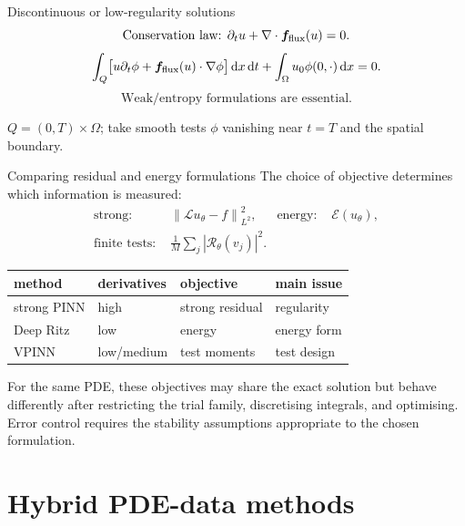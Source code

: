 \documentclass[aspectratio=43,11pt]{beamer}
\newcommand{\slideid}{L3}
\newcommand{\dd}{\,\mathrm d}
\newcommand{\Lop}{\mathcal{L}}
\newcommand{\Energy}{\mathcal{E}}
\newcommand{\WeakRes}{\mathcal{R}}
\newcommand{\norm}[1]{\left\lVert #1\right\rVert}
\newcommand{\labnote}[1]{{\scriptsize\color{courseBlue}#1\par}}
\begin{document}
\renewcommand{\slideid}{L3-S095}
\begin{frame}[c]{Discontinuous or low-regularity solutions}
\small
\[
\text{Conservation law: }
\partial_tu+\nabla\cdot \bm f_{\rm flux}(u)=0.
\]
\[
\int_Q\bigl[u\partial_t\phi+\bm f_{\rm flux}(u)\cdot\nabla\phi\bigr]\dd x\dd t
+\int_\Omega u_0\phi(0,\cdot)\dd x=0.
\]
\[
\text{Weak/entropy formulations are essential.}
\]
\labnote{$Q=(0,T)\times\Omega$; take smooth tests $\phi$ vanishing near $t=T$ and the spatial boundary.}
\end{frame}

\renewcommand{\slideid}{L3-S096}
\begin{frame}[c]{Comparing residual and energy formulations}
\small
The choice of objective determines which information is measured:
\[
\begin{aligned}
\text{strong: }&\norm{\Lop u_\theta-f}_{L^2}^2,
&\text{energy: }&\Energy(u_\theta),\\
\text{finite tests: }&\frac1M\sum_j|\WeakRes_\theta(v_j)|^2.
\end{aligned}
\]
\begin{center}
\begin{tabular}{llll}
\toprule
method & derivatives & objective & main issue \\
\midrule
strong PINN & high & strong residual & regularity \\
Deep Ritz & low & energy & energy form \\
VPINN & low/medium & test moments & test design \\
\bottomrule
\end{tabular}
\end{center}
\medskip
For the same PDE, these objectives may share the exact solution but behave
differently after restricting the trial family, discretising integrals, and
optimising. Error control requires the stability assumptions appropriate to
the chosen formulation.
\end{frame}

\section{Hybrid PDE-data methods}
\end{document}
